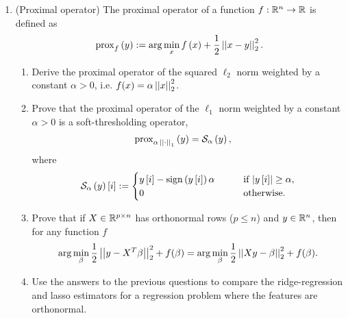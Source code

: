 \documentclass[12pt,twoside]{article}
\begin{document}
\begin{enumerate}
 \item (Proximal operator) The proximal operator of a function $f: \mathbb{R}^n \rightarrow \mathbb{R}$ is defined as
\begin{align}
\operatorname{prox}_{f}\left( y \right) := \arg \min_{x} f\left( x \right)+ \frac{1}{2} \left|\left| x-y \right|\right| _{2}^2.
\end{align}
  \begin{enumerate}
  \item Derive the proximal operator of the squared $\ell_2$ norm weighted by a constant $\alpha > 0$, i.e. $f(x)=\alpha \left|\left| x \right|\right| _{2}^2$.
  \item Prove that the proximal operator of the $\ell_1$ norm weighted by a constant $\alpha > 0$ is a soft-thresholding operator,
\begin{align}
\operatorname{prox}_{\alpha \, \left|\left|  \cdot  \right|\right| _{1}}\left(  y  \right) & = \mathcal{ S }_{\alpha}\left( y \right),
\end{align}
where 
\begin{align}
\mathcal{ S }_{\alpha}\left( y \right)[i] := 
\begin{cases}
y\,[i] - \operatorname{sign}\left( y\,[i] \right) \alpha  \qquad & \text{if $\lvert y\,[i]\rvert \geq \alpha$}, \\
0 \quad & \text{otherwise}.
\end{cases}
\end{align}
    \item Prove that if $X \in \mathbb{R}^{p \times n}$ has orthonormal rows ($p \leq n$) and $y \in \mathbb{R}^{n}$, then for any function $f$
\begin{align}
\arg \min_{\beta} \frac{1}{2} \left|\left|  y - X^T\beta  \right|\right| _{2}^2 + f(\beta) = \arg \min_{\beta} \frac{1}{2} \left|\left|  Xy - \beta  \right|\right| _{2}^2 + f(\beta).
\end{align}
\item Use the answers to the previous questions to compare the ridge-regression and lasso estimators for a regression problem where the features are orthonormal.
  \end{enumerate}


\end{enumerate}
\end{document}
